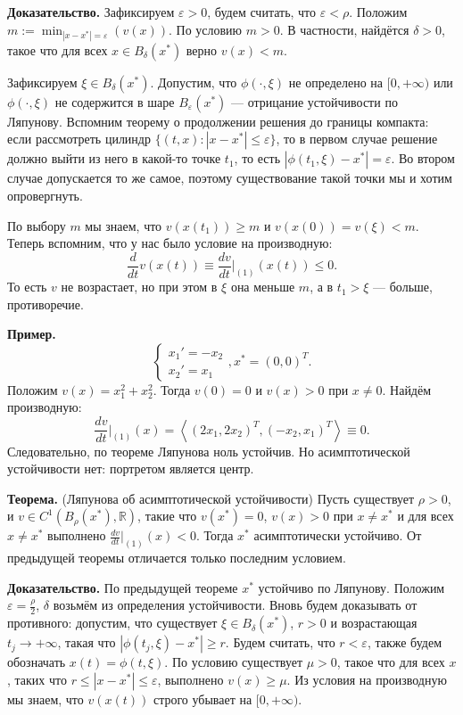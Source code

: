 \textbf{Доказательство.} Зафиксируем $\varepsilon > 0$, будем считать, что $\varepsilon < \rho$.
Положим $m := \min_{|x - x^*| = \varepsilon} (v(x))$.
По условию $m > 0$.
В частности, найдётся $\delta > 0$, такое что для всех $x \in B_{\delta}(x^*)$ верно $v(x) < m$.

Зафиксируем $\xi \in B_\delta(x^*)$. Допустим, что $\phi(\cdot, \xi)$ не определено на $[0, +\infty)$ или $\phi(\cdot, \xi)$ не содержится в шаре $B_\varepsilon(x^*)$ --- отрицание устойчивости по Ляпунову.
Вспомним теорему о продолжении решения до границы компакта: если рассмотреть цилиндр $\{(t, x): |x - x^*| \le \varepsilon\}$, то в первом случае решение должно выйти из него в какой-то точке $t_1$, то есть $|\phi(t_1, \xi) - x^*| = \varepsilon$.
Во втором случае допускается то же самое, поэтому существование такой точки мы и хотим опровергнуть.

По выбору $m$ мы знаем, что $v(x(t_1)) \ge m$ и $v(x(0)) = v(\xi) < m$.
Теперь вспомним, что у нас было условие на производную:
\[
    \frac{d}{dt} v(x(t)) \equiv \frac{dv}{dt} \bigg|_{(1)} (x(t)) \le 0.
\]
То есть $v$ не возрастает, но при этом в $\xi$ она меньше $m$, а в $t_1 > \xi$ --- больше, противоречие.

\QED

\textbf{Пример.}
\[
    \begin{cases}
        x_1' = -x_2 \\
        x_2' = x_1
    \end{cases}
    ,
    x^* = (0, 0)^T.
\]
Положим $v(x) = x_1^2 + x_2^2$. Тогда $v(0) = 0$ и $v(x) > 0$ при $x \ne 0$.
Найдём производную:
\[
    \frac{dv}{dt} \bigg|_{(1)} (x) = \left< (2x_1, 2x_2)^T, (-x_2, x_1)^T \right> \equiv 0.
\]
Следовательно, по теореме Ляпунова ноль устойчив.
Но асимптотической устойчивости нет: портретом является центр.

\textbf{Теорема.} (Ляпунова об асимптотической устойчивости) Пусть существует $\rho > 0$, и $v \in C^1(B_{\rho}(x^*), \mathbb R)$, такие что $v(x^*) = 0$, $v(x) > 0$ при $x \ne x^*$ и для всех $x \ne x^*$ выполнено $\frac{dv}{dt} \big|_{(1)} (x) < 0$.
Тогда $x^*$ асимптотически устойчиво.
От предыдущей теоремы отличается только последним условием.

\textbf{Доказательство.} По предыдущей теореме $x^*$ устойчиво по Ляпунову.
Положим $\varepsilon = \frac{\rho}{2}$, $\delta$ возьмём из определения устойчивости.
Вновь будем доказывать от противного: допустим, что существует $\xi \in B_\delta(x^*)$, $r > 0$ и возрастающая $t_j \to +\infty$, такая что $|\phi(t_j, \xi) - x^*| \ge r$.
Будем считать, что $r < \varepsilon$, также будем обозначать $x(t) = \phi(t, \xi)$.
По условию существует $\mu > 0$, такое что для всех $x$, таких что $r \le |x - x^*| \le \varepsilon$, выполнено $v(x) \ge \mu$.
Из условия на производную мы знаем, что $v(x(t))$ строго убывает на $[0, +\infty)$.


